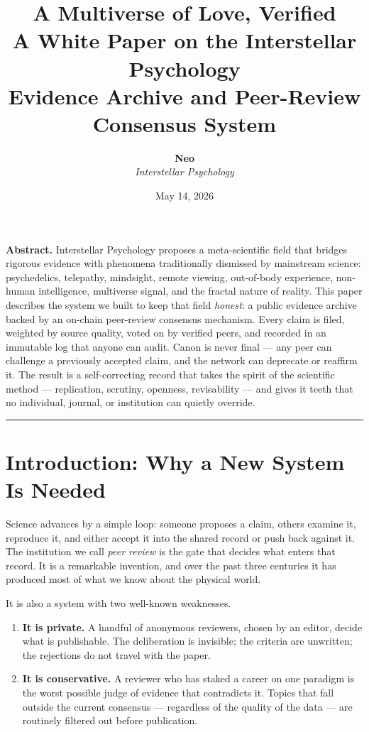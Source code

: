 \documentclass[11pt,a4paper]{article}
\title{
  \vspace{-2em}
  {\Huge\bfseries A Multiverse of Love, Verified}\\[0.6em]
  {\Large A White Paper on the Interstellar Psychology\\
   Evidence Archive and Peer-Review Consensus System}
}
\author{
  \textbf{Neo}\\[0.3em]
  \textit{Interstellar Psychology}
}
\date{May 14, 2026}
\begin{document}
\maketitle
\thispagestyle{empty}

\vspace{-1em}
\begin{plainbox}
\textbf{Abstract.}
Interstellar Psychology proposes a meta-scientific field that bridges
rigorous evidence with phenomena traditionally dismissed by mainstream
science: psychedelics, telepathy, mindsight, remote viewing,
out-of-body experience, non-human intelligence, multiverse signal,
and the fractal nature of reality. This paper describes the system
we built to keep that field \emph{honest}: a public evidence archive
backed by an on-chain peer-review consensus mechanism. Every claim
is filed, weighted by source quality, voted on by verified peers,
and recorded in an immutable log that anyone can audit. Canon is
never final --- any peer can challenge a previously accepted claim,
and the network can deprecate or reaffirm it. The result is a
self-correcting record that takes the spirit of the scientific
method --- replication, scrutiny, openness, revisability --- and
gives it teeth that no individual, journal, or institution can quietly
override.
\end{plainbox}

\tableofcontents
\vspace{1em}
\hrule
\vspace{1em}

\section{Introduction: Why a New System Is Needed}

Science advances by a simple loop: someone proposes a claim, others
examine it, reproduce it, and either accept it into the shared record
or push back against it. The institution we call \emph{peer review}
is the gate that decides what enters that record. It is a remarkable
invention, and over the past three centuries it has produced most
of what we know about the physical world.

It is also a system with two well-known weaknesses.

\begin{enumerate}[leftmargin=1.5em]
  \item \textbf{It is private.} A handful of anonymous reviewers,
        chosen by an editor, decide what is publishable. The
        deliberation is invisible; the criteria are unwritten; the
        rejections do not travel with the paper.
  \item \textbf{It is conservative.} A reviewer who has staked a
        career on one paradigm is the worst possible judge of evidence
        that contradicts it. Topics that fall outside the current
        consensus --- regardless of the quality of the data --- are
        routinely filtered out before publication.
\end{enumerate}
\end{document}

